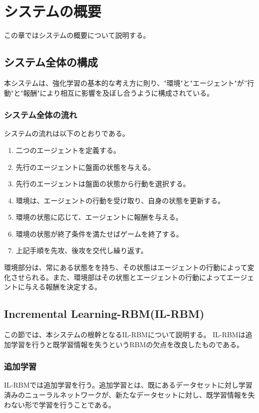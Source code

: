 \chapter{システムの概要}
この章ではシステムの概要について説明する。


\section{システム全体の構成}
本システムは、強化学習の基本的な考え方に則り、"環境"と"エージェント"が”行動"と"報酬"により相互に影響を及ぼし合うように構成されている。

\subsection{システム全体の流れ}
システムの流れは以下のとおりである。

\begin{enumerate}
  \item 二つのエージェントを定義する。
  \item 先行のエージェントに盤面の状態を与える。
  \item 先行のエージェントは盤面の状態から行動を選択する。
  \item 環境は、エージェントの行動を受け取り、自身の状態を更新する。
  \item 環境の状態に応じて、エージェントに報酬を与える。
  \item 環境の状態が終了条件を満たせばゲームを終了する。
  \item 上記手順を先攻、後攻を交代し繰り返す。
\end{enumerate}



環境部分は、常にある状態をを持ち、その状態はエージェントの行動によって変化させられる。また、環境部はその状態とエージェントの行動によってエージェントに与える報酬を決定する。

\section{Incremental Learning-RBM(IL-RBM)}

この節では、本システムの根幹となるIL-RBMについて説明する。
IL-RBMは追加学習を行うと既学習情報を失うというRBMの欠点を改良したものである。

\subsection{追加学習}
IL-RBMでは追加学習を行う。追加学習とは、既にあるデータセットに対し学習済みのニューラルネットワークが、新たなデータセットに対し、既学習情報を失わない形で学習を行うことである。

